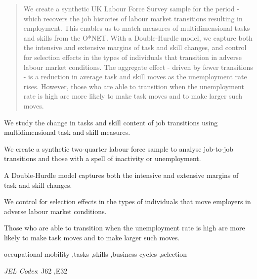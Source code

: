 \documentclass[12pt,authoryear]{elsarticle}
\begin{document}
\begin{frontmatter}
		
		\begin{abstract}
We create a synthetic UK Labour Force Survey sample for the period \hspace{-1mm}-\hspace{-1mm} which recovers the job histories of labour market transitions resulting in employment. This enables us to match measures of multidimensional tasks and skills from the O*NET. With a Double-Hurdle model, we capture both the intensive and extensive margins of task and skill changes, and control for selection effects in the types of individuals that transition in adverse labour market conditions. The aggregate effect - driven by fewer transitions - is a reduction in average task and skill moves as the unemployment rate rises. However, those who are able to transition when the unemployment rate is high are more likely to make task moves and to make larger such moves.
		\end{abstract}
		

		\begin{highlights}
			\item We study the change in tasks and skill content of job transitions using multidimensional task and skill measures.
			\item We create a synthetic two-quarter labour force sample to analyse job-to-job transitions and those with a spell of inactivity or unemployment.
			\item A Double-Hurdle model captures both the intensive and extensive margins of task and skill changes.
			\item We control for selection effects in the types of individuals that move employers in adverse labour market conditions.
			\item Those who are able to transition when the unemployment rate is high are more likely to make task moves and to make larger such moves.
		\end{highlights}

		
		\begin{keyword}
			occupational mobility  \sep tasks  \sep skills  \sep business cycles \sep selection
			
			
			
			\textit{JEL Codes}: J62 \sep E32
			
		\end{keyword}
		
		
		
	\end{frontmatter}
	
\end{document}
